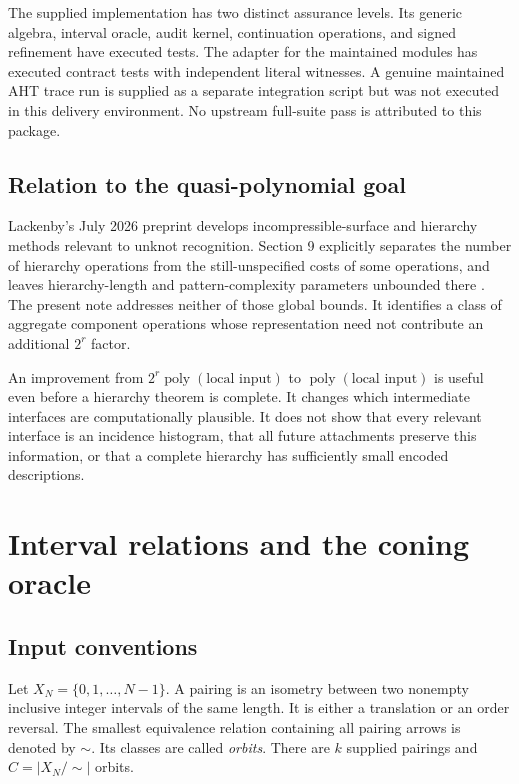 \documentclass[11pt]{article}
\theoremstyle{definition}
\newcommand{\poly}{\operatorname{poly}}
\begin{document}
The supplied implementation has two distinct assurance levels. Its generic
algebra, interval oracle, audit kernel, continuation operations, and signed
refinement have executed tests. The adapter for the maintained modules has
executed contract tests with independent literal witnesses. A genuine
maintained AHT trace run is supplied as a separate integration script but
was not executed in this delivery environment. No upstream full-suite pass
is attributed to this package.

\subsection{Relation to the quasi-polynomial goal}
Lackenby's July 2026 preprint develops incompressible-surface and hierarchy
methods relevant to unknot recognition. Section 9 explicitly separates the
number of hierarchy operations from the still-unspecified costs of some
operations, and leaves hierarchy-length and pattern-complexity parameters
unbounded there \cite{lackenby2026}. The present note addresses neither of
those global bounds. It identifies a class of aggregate component operations
whose representation need not contribute an additional $2^r$ factor.

An improvement from $2^r\poly(\text{local input})$ to
$\poly(\text{local input})$ is useful even before a hierarchy theorem is
complete. It changes which intermediate interfaces are computationally
plausible. It does not show that every relevant interface is an incidence
histogram, that all future attachments preserve this information, or that
a complete hierarchy has sufficiently small encoded descriptions.

\section{Interval relations and the coning oracle}
\label{sec:model}

\subsection{Input conventions}
Let $X_N=\{0,1,\ldots,N-1\}$. A pairing is an isometry between two nonempty
inclusive integer intervals of the same length. It is either a translation
or an order reversal. The smallest equivalence relation containing all
pairing arrows is denoted by $\sim$. Its classes are called \emph{orbits}.
There are $k$ supplied pairings and $C=|X_N/{\sim}|$ orbits.
\end{document}
